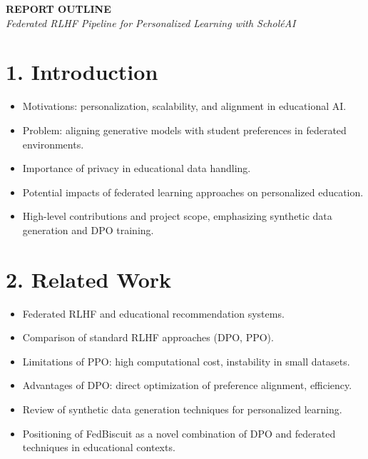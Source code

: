 \documentclass[headsepline,footsepline,footinclude=false,oneside,fontsize=10pt,paper=a4]{scrbook}
\begin{document}

\begin{center}
    \LARGE \textbf{REPORT OUTLINE} \\[0.5cm]
    \normalsize \textit{Federated RLHF Pipeline for Personalized Learning with ScholéAI}
\end{center}

\vspace{1.5cm}

\section*{1. Introduction}
\begin{itemize}[leftmargin=1.5em]
    \item Motivations: personalization, scalability, and alignment in educational AI.
    \item Problem: aligning generative models with student preferences in federated environments.
    \item Importance of privacy in educational data handling.
    \item Potential impacts of federated learning approaches on personalized education.
    \item High-level contributions and project scope, emphasizing synthetic data generation and DPO training.
\end{itemize}

\section*{2. Related Work}
\begin{itemize}[leftmargin=1.5em]
    \item Federated RLHF and educational recommendation systems.
    \item Comparison of standard RLHF approaches (DPO, PPO).
    \item Limitations of PPO: high computational cost, instability in small datasets.
    \item Advantages of DPO: direct optimization of preference alignment, efficiency.
    \item Review of synthetic data generation techniques for personalized learning.
    \item Positioning of FedBiscuit as a novel combination of DPO and federated techniques in educational contexts.
\end{itemize}
\end{document}
